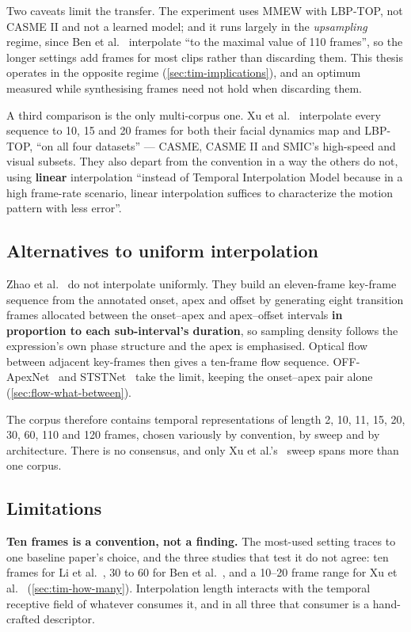Two caveats limit the transfer. The experiment uses MMEW with LBP-TOP, not CASME II and not a learned model; and it runs largely in the \textit{upsampling} regime, since Ben et al.~\cite{ben2021} interpolate ``to the maximal value of 110 frames'', so the longer settings add frames for most clips rather than discarding them. This thesis operates in the opposite regime (\autoref{sec:tim-implications}), and an optimum measured while synthesising frames need not hold when discarding them.

A third comparison is the only multi-corpus one. Xu et al.~\cite{xu2017} interpolate every sequence to 10, 15 and 20 frames for both their facial dynamics map and LBP-TOP, ``on all four datasets'' --- CASME, CASME II and SMIC's high-speed and visual subsets. They also depart from the convention in a way the others do not, using \textbf{linear} interpolation ``instead of Temporal Interpolation Model because in a high frame-rate scenario, linear interpolation suffices to characterize the motion pattern with less error''.

\subsection{Alternatives to uniform interpolation}
\label{sec:tim-keyframe}

Zhao et al.~\cite{zhaoS2021} do not interpolate uniformly. They build an eleven-frame key-frame sequence from the annotated onset, apex and offset by generating eight transition frames allocated between the onset--apex and apex--offset intervals \textbf{in proportion to each sub-interval's duration}, so sampling density follows the expression's own phase structure and the apex is emphasised. Optical flow between adjacent key-frames then gives a ten-frame flow sequence. OFF-ApexNet~\cite{liong2019a} and STSTNet~\cite{liong2019b} take the limit, keeping the onset--apex pair alone (\autoref{sec:flow-what-between}).

The corpus therefore contains temporal representations of length 2, 10, 11, 15, 20, 30, 60, 110 and 120 frames, chosen variously by convention, by sweep and by architecture. There is no consensus, and only Xu et al.'s~\cite{xu2017} sweep spans more than one corpus.

\subsection{Limitations}
\label{sec:tim-limitations}

\textbf{Ten frames is a convention, not a finding.} The most-used setting traces to one baseline paper's choice, and the three studies that test it do not agree: ten frames for Li et al.~\cite{liX2018}, 30 to 60 for Ben et al.~\cite{ben2021}, and a 10--20 frame range for Xu et al.~\cite{xu2017} (\autoref{sec:tim-how-many}). Interpolation length interacts with the temporal receptive field of whatever consumes it, and in all three that consumer is a hand-crafted descriptor.

